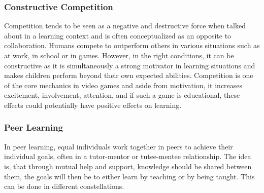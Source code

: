 \subsubsection{Constructive Competition}
Competition tends to be seen as a negative and destructive force when talked about in a learning context and is often conceptualized as an opposite to collaboration\cite{collaborationCompetition}. Humans compete to outperform others in various situations such as at work, in school or in games\cite{collaborationCompetitionGames}\cite{collaborationCompetition}. However, in the right conditions, it can be constructive as it is simultaneously a strong motivator in learning situations\cite{collaborationCompetitionGames} and makes children perform beyond their own expected abilities\cite{collaborationCompetition}. Competition is one of the core mechanics in video games and aside from  motivation, it increases excitement, involvement, attention, and if such a game is educational, these effects could potentially have positive effects on learning\cite{collaborationCompetitionGames}. 

\subsubsection{Peer Learning} %
In peer learning, equal individuals work together in peers to achieve their individual goals\cite{peerLearning}, often in a tutor-mentor or tutee-mentee relationship. The idea is, that through mutual help and support, knowledge should be shared between them, the goals will then be to either learn by teaching or by being taught. This can be done in different constellations\cite{collaborationCompetition}.

